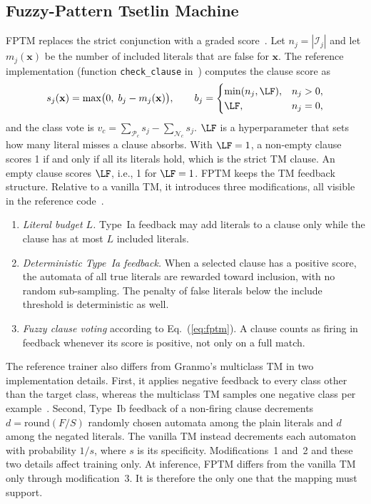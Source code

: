 \subsection{Fuzzy-Pattern Tsetlin Machine}
FPTM replaces the strict conjunction with a graded score~\cite{hnilov2025fptm,hnilov2025code}.
Let $n_j=|\mathcal{I}_j|$ and let $m_j(\mathbf{x})$ be the number of included literals that are false for $\mathbf{x}$.
The reference implementation (function \texttt{check\_clause} in~\cite{hnilov2025code}) computes the clause score as
\begin{equation}\label{eq:fptm}
s_j(\mathbf{x}) = \max\bigl(0,\; b_j - m_j(\mathbf{x})\bigr),\qquad
b_j = \begin{cases} \min(n_j, \LF), & n_j>0,\\ \LF, & n_j=0,\end{cases}
\end{equation}
and the class vote is $v_c=\sum_{\mathcal{P}_c}s_j-\sum_{\mathcal{N}_c}s_j$.
$\LF$ is a hyperparameter that sets how many literal misses a clause absorbs.
With $\LF=1$, a non-empty clause scores 1 if and only if all its literals hold, which is the strict TM clause. An empty clause scores $\LF$, i.e., 1 for $\LF=1$.
FPTM keeps the TM feedback structure.
Relative to a vanilla TM, it introduces three modifications, all visible in the reference code~\cite{hnilov2025code}.
\begin{enumerate}
\item \emph{Literal budget $L$.} Type~Ia feedback may add literals to a clause only while the clause has at most $L$ included literals.
\item \emph{Deterministic Type~Ia feedback.} When a selected clause has a positive score, the automata of all true literals are rewarded toward inclusion, with no random sub-sampling. The penalty of false literals below the include threshold is deterministic as well.
\item \emph{Fuzzy clause voting} according to Eq.~(\ref{eq:fptm}). A clause counts as firing in feedback whenever its score is positive, not only on a full match.
\end{enumerate}
The reference trainer also differs from Granmo's multiclass TM in two implementation details.
First, it applies negative feedback to every class other than the target class, whereas the multiclass TM samples one negative class per example~\cite{granmo2018tsetlin}.
Second, Type~Ib feedback of a non-firing clause decrements $d=\mathrm{round}(F/S)$ randomly chosen automata among the plain literals and $d$ among the negated literals. The vanilla TM instead decrements each automaton with probability $1/s$, where $s$ is its specificity.
Modifications~1 and~2 and these two details affect training only.
At inference, FPTM differs from the vanilla TM only through modification~3. It is therefore the only one that the \gainp{} mapping must support.

